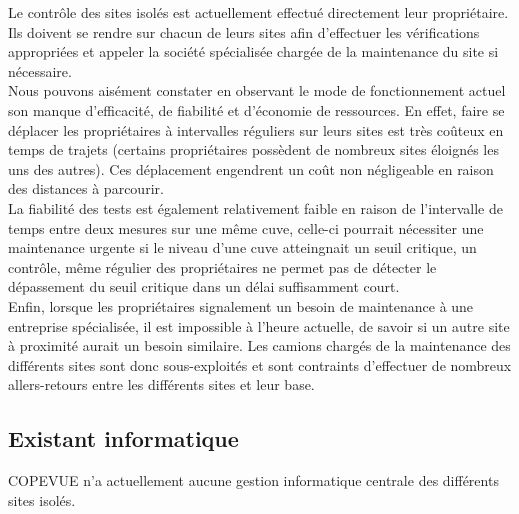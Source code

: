 Le contrôle des sites isolés est actuellement effectué directement leur propriétaire. Ils doivent se rendre sur chacun de leurs sites afin d'effectuer les vérifications appropriées et appeler la société spécialisée chargée de la maintenance du site si nécessaire.\\
Nous pouvons aisément constater en observant le mode de fonctionnement actuel son manque d'efficacité, de fiabilité et d'économie de ressources. En effet, faire se déplacer les propriétaires à intervalles réguliers sur leurs sites est très coûteux en temps de trajets (certains propriétaires possèdent de nombreux sites éloignés les uns des autres). Ces déplacement engendrent un coût non négligeable en raison des distances à parcourir. \\
La fiabilité des tests est également relativement faible en raison de l'intervalle de temps entre deux mesures sur une même cuve, celle-ci pourrait nécessiter une maintenance urgente si le niveau d'une cuve atteingnait un seuil critique, un contrôle, même régulier des propriétaires ne permet pas de détecter le dépassement du seuil critique dans un délai suffisamment court.\\
Enfin, lorsque les propriétaires signalement un besoin de maintenance à une entreprise spécialisée, il est impossible à l'heure actuelle, de savoir si un autre site à proximité aurait un besoin similaire. Les camions chargés de la maintenance des différents sites sont donc sous-exploités et sont contraints d'effectuer de nombreux allers-retours entre les différents sites et leur base.

\subsection {Existant informatique}

COPEVUE n'a actuellement aucune gestion informatique centrale des différents sites isolés.
